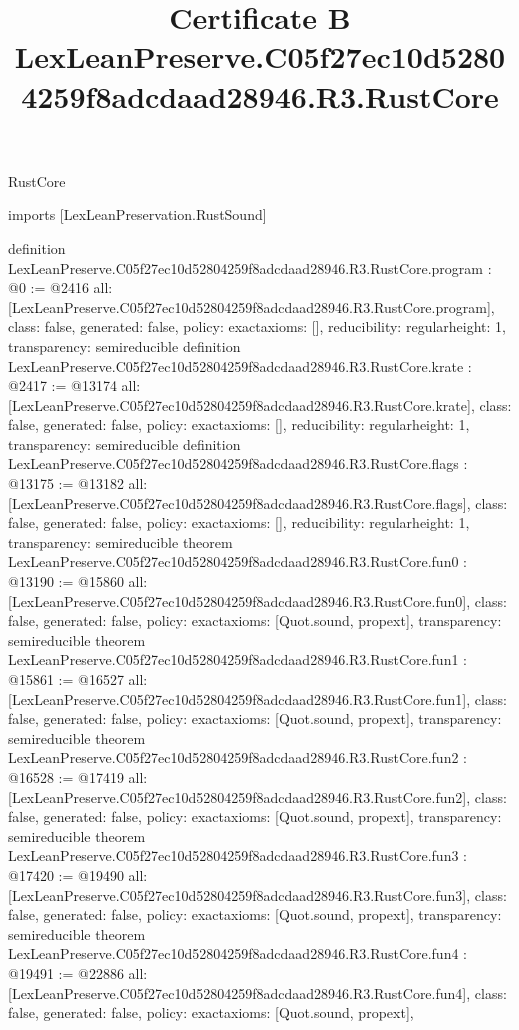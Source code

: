 \begin{lexlean}{RustCore}
\title{Certificate B LexLeanPreserve.C05f27ec10d52804259f8adcdaad28946.R3.RustCore}
\begin{coremodule}
imports [LexLeanPreservation.RustSound]

definition LexLeanPreserve.C05f27ec10d52804259f8adcdaad28946.R3.RustCore.program : @0 := @2416 {
  all: [LexLeanPreserve.C05f27ec10d52804259f8adcdaad28946.R3.RustCore.program],
  class: false,
  generated: false,
  policy: exact{axioms: []},
  reducibility: regular{height: 1},
  transparency: semireducible
}
definition LexLeanPreserve.C05f27ec10d52804259f8adcdaad28946.R3.RustCore.krate : @2417 := @13174 {
  all: [LexLeanPreserve.C05f27ec10d52804259f8adcdaad28946.R3.RustCore.krate],
  class: false,
  generated: false,
  policy: exact{axioms: []},
  reducibility: regular{height: 1},
  transparency: semireducible
}
definition LexLeanPreserve.C05f27ec10d52804259f8adcdaad28946.R3.RustCore.flags : @13175 := @13182 {
  all: [LexLeanPreserve.C05f27ec10d52804259f8adcdaad28946.R3.RustCore.flags],
  class: false,
  generated: false,
  policy: exact{axioms: []},
  reducibility: regular{height: 1},
  transparency: semireducible
}
theorem LexLeanPreserve.C05f27ec10d52804259f8adcdaad28946.R3.RustCore.fun0 : @13190 := @15860 {
  all: [LexLeanPreserve.C05f27ec10d52804259f8adcdaad28946.R3.RustCore.fun0],
  class: false,
  generated: false,
  policy: exact{axioms: [Quot.sound, propext]},
  transparency: semireducible
}
theorem LexLeanPreserve.C05f27ec10d52804259f8adcdaad28946.R3.RustCore.fun1 : @15861 := @16527 {
  all: [LexLeanPreserve.C05f27ec10d52804259f8adcdaad28946.R3.RustCore.fun1],
  class: false,
  generated: false,
  policy: exact{axioms: [Quot.sound, propext]},
  transparency: semireducible
}
theorem LexLeanPreserve.C05f27ec10d52804259f8adcdaad28946.R3.RustCore.fun2 : @16528 := @17419 {
  all: [LexLeanPreserve.C05f27ec10d52804259f8adcdaad28946.R3.RustCore.fun2],
  class: false,
  generated: false,
  policy: exact{axioms: [Quot.sound, propext]},
  transparency: semireducible
}
theorem LexLeanPreserve.C05f27ec10d52804259f8adcdaad28946.R3.RustCore.fun3 : @17420 := @19490 {
  all: [LexLeanPreserve.C05f27ec10d52804259f8adcdaad28946.R3.RustCore.fun3],
  class: false,
  generated: false,
  policy: exact{axioms: [Quot.sound, propext]},
  transparency: semireducible
}
theorem LexLeanPreserve.C05f27ec10d52804259f8adcdaad28946.R3.RustCore.fun4 : @19491 := @22886 {
  all: [LexLeanPreserve.C05f27ec10d52804259f8adcdaad28946.R3.RustCore.fun4],
  class: false,
  generated: false,
  policy: exact{axioms: [Quot.sound, propext]},
}
\end{coremodule}
\end{lexlean}
